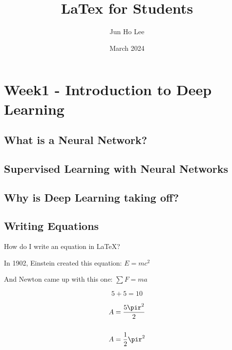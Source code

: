 \documentclass{article}
\title{LaTex for Students}
\author{Jun Ho Lee}
\date{March 2024}
\begin{document}
\newpage

\section{Week1 - Introduction to Deep Learning}

\subsection{What is a Neural Network?}

\subsection{Supervised Learning with Neural Networks}

\subsection{Why is Deep Learning taking off?}

\subsection{Writing Equations}
How do I write an equation in \LaTeX?

    In 1902, Einstein created this equation: $E=mc^2$

    And Newton came up with this one: $\sum F=ma$

    \begin{equation}
        5+5=10
    \end{equation}

    \begin{equation}
        \begin{split}
            A & = \frac{5\pir^2}{2} \\\\
            A & = \frac{1}{2} \pir^2
        \end{split}
    \end{equation}
\end{document}

